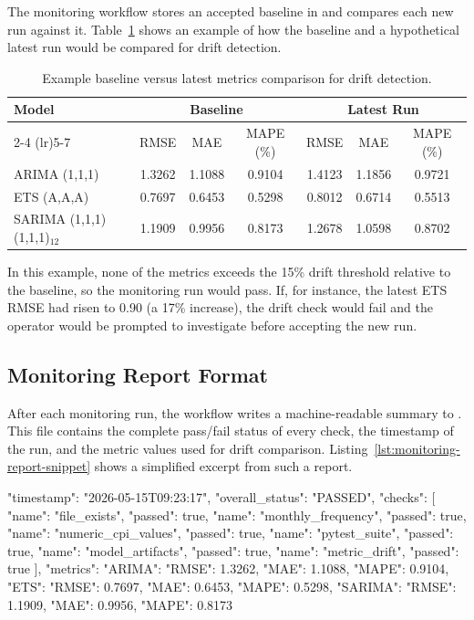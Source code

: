 The monitoring workflow stores an accepted baseline in  and compares each new run against it. Table~\ref{tab:baseline-latest-comparison} shows an example of how the baseline and a hypothetical latest run would be compared for drift detection.

\begin{table}[htbp]
	\centering
	\caption{Example baseline versus latest metrics comparison for drift detection.}
	\label{tab:baseline-latest-comparison}
	\begin{tabular}{lcccccc}
		\hline
		\textbf{Model} & \multicolumn{3}{c}{\textbf{Baseline}} & \multicolumn{3}{c}{\textbf{Latest Run}} \\
		\cmidrule(lr){2-4} \cmidrule(lr){5-7}
		& RMSE & MAE & MAPE (\%) & RMSE & MAE & MAPE (\%) \\
		\hline
		ARIMA (1,1,1) & 1.3262 & 1.1088 & 0.9104 & 1.4123 & 1.1856 & 0.9721 \\
		ETS (A,A,A) & 0.7697 & 0.6453 & 0.5298 & 0.8012 & 0.6714 & 0.5513 \\
		SARIMA (1,1,1)(1,1,1)$_{12}$ & 1.1909 & 0.9956 & 0.8173 & 1.2678 & 1.0598 & 0.8702 \\
		\hline
	\end{tabular}
\end{table}

In this example, none of the metrics exceeds the 15\% drift threshold relative to the baseline, so the monitoring run would pass. If, for instance, the latest ETS RMSE had risen to 0.90 (a 17\% increase), the drift check would fail and the operator would be prompted to investigate before accepting the new run.

\subsection{Monitoring Report Format}

After each monitoring run, the workflow writes a machine-readable summary to . This file contains the complete pass/fail status of every check, the timestamp of the run, and the metric values used for drift comparison. Listing~\ref{lst:monitoring-report-snippet} shows a simplified excerpt from such a report.

\begin{Python}[caption={Simplified excerpt from a monitoring report JSON file}, label={lst:monitoring-report-snippet}]
{
  "timestamp": "2026-05-15T09:23:17",
  "overall_status": "PASSED",
  "checks": [
    {"name": "file_exists", "passed": true},
    {"name": "monthly_frequency", "passed": true},
    {"name": "numeric_cpi_values", "passed": true},
    {"name": "pytest_suite", "passed": true},
    {"name": "model_artifacts", "passed": true},
    {"name": "metric_drift", "passed": true}
  ],
  "metrics": {
    "ARIMA": {"RMSE": 1.3262, "MAE": 1.1088, "MAPE": 0.9104},
    "ETS": {"RMSE": 0.7697, "MAE": 0.6453, "MAPE": 0.5298},
    "SARIMA": {"RMSE": 1.1909, "MAE": 0.9956, "MAPE": 0.8173}
  }
}
\end{Python}

